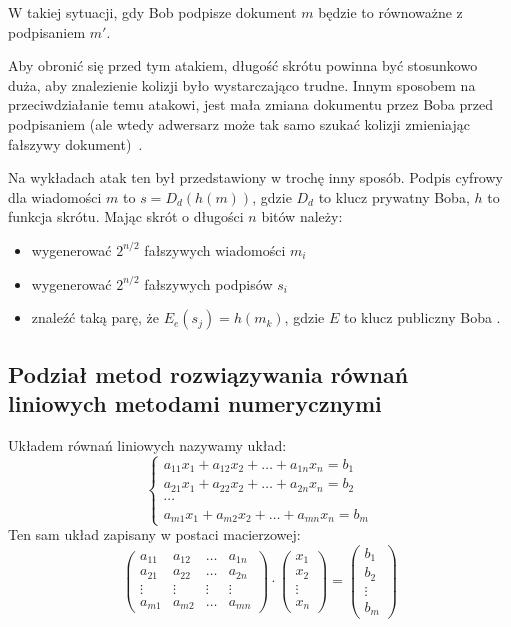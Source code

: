 \documentclass[wi]{zut}
\begin{document}
W takiej sytuacji, gdy Bob podpisze dokument $m$ będzie to równoważne z podpisaniem $m'$.

Aby obronić się przed tym atakiem, długość skrótu powinna być stosunkowo duża, aby znalezienie kolizji było wystarczająco trudne. Innym sposobem na przeciwdziałanie temu atakowi, jest mała zmiana dokumentu przez Boba przed podpisaniem (ale wtedy adwersarz może tak samo szukać kolizji zmieniając fałszywy dokument)~\cite{wiki:Birthday_problem}.

Na wykładach atak ten był przedstawiony w trochę inny sposób. Podpis cyfrowy dla wiadomości $m$ to $s = D_d(h(m))$, gdzie $D_d$ to klucz prywatny Boba, $h$ to funkcja skrótu. Mając skrót o długości $n$ bitów należy:

\begin{itemize}
    \item wygenerować $2^{n/2}$ fałszywych wiadomości $m_i$
    \item wygenerować $2^{n/2}$ fałszywych podpisów $s_i$
    \item znaleźć taką parę, że $E_e(s_j) = h(m_k)$, gdzie $E$ to klucz publiczny Boba \cite{Chocian2020}.
\end{itemize}

\subsection{Podział metod rozwiązywania równań liniowych metodami numerycznymi}

Układem równań liniowych nazywamy układ:
$$
\left\{\begin{array}{l}
a_{11} x_{1}+a_{12} x_{2}+\ldots+a_{1 n} x_{n}=b_{1} \\
a_{21} x_{1}+a_{22} x_{2}+\ldots+a_{2 n} x_{n}=b_{2} \\
\cdots \\
a_{m 1} x_{1}+a_{m 2} x_{2}+\ldots+a_{m n} x_{n}=b_{m}
\end{array}\right.
$$
Ten sam układ zapisany w postaci macierzowej:
$$
\left(\begin{array}{cccc}
a_{11} & a_{12} & \ldots & a_{1 n} \\
a_{21} & a_{22} & \ldots & a_{2 n} \\
\vdots & \vdots & \vdots & \vdots \\
a_{m 1} & a_{m 2} & \ldots & a_{m n}
\end{array}\right) \cdot\left(\begin{array}{c}
x_{1} \\
x_{2} \\
\vdots \\
x_{n}
\end{array}\right)=\left(\begin{array}{c}
b_{1} \\
b_{2} \\
\vdots \\
b_{m}
\end{array}\right)
$$
\end{document}
